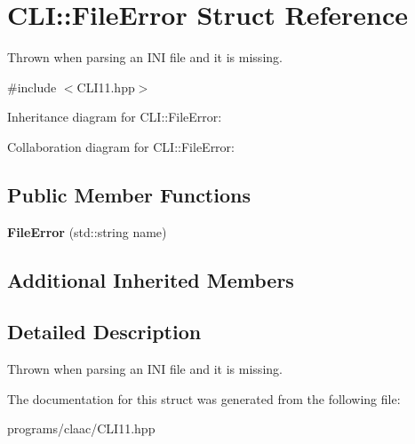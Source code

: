 \hypertarget{struct_c_l_i_1_1_file_error}{}\section{C\+LI\+:\+:File\+Error Struct Reference}
\label{struct_c_l_i_1_1_file_error}


Thrown when parsing an I\+NI file and it is missing.  




{\ttfamily \#include $<$C\+L\+I11.\+hpp$>$}



Inheritance diagram for C\+LI\+:\+:File\+Error\+:


Collaboration diagram for C\+LI\+:\+:File\+Error\+:
\subsection*{Public Member Functions}
\begin{DoxyCompactItemize}
\item 
\mbox{\label{struct_c_l_i_1_1_file_error_a016a6b1162d93112a0446a0bc2afc68d}} 
{\bfseries File\+Error} (std\+::string name)
\end{DoxyCompactItemize}
\subsection*{Additional Inherited Members}


\subsection{Detailed Description}
Thrown when parsing an I\+NI file and it is missing. 

The documentation for this struct was generated from the following file\+:\begin{DoxyCompactItemize}
\item 
programs/claac/C\+L\+I11.\+hpp\end{DoxyCompactItemize}
